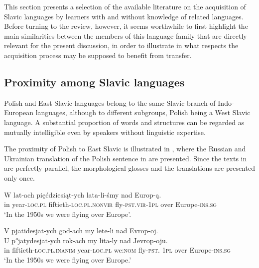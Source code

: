 \documentclass[output=paper,            colorlinks, citecolor=brown            		  ]{langscibook}
\begin{document}
This section presents a selection of the available literature on the acquisition of Slavic languages by learners with and without knowledge of related languages. Before turning to the review, however, it seems worthwhile to first highlight the main similarities between the members of this language family that are directly relevant for the present discussion, in order to illustrate in what respects the acquisition process may be supposed to benefit from transfer.

\subsection{Proximity among Slavic languages}\label{sec:saturno:2.1}

Polish and East Slavic languages belong to the same Slavic branch of Indo-Eu\-ro\-pe\-an languages, although to different subgroups, Polish being a West Slavic language. A substantial proportion of words and structures can be regarded as mutually intelligible even by speakers without linguistic expertise. 

The proximity of Polish to East Slavic is illustrated in , where the Russian and Ukrainian translation of the Polish sentence in  are presented. Since the texts in  are perfectly parallel, the morphological glosses and the translations are presented only once.

\ea\label{ex:saturno:1}
\gll W  lat-ach  pięćdziesiąt-ych   lata-li-śmy   nad   Europ-ą.\footnotemark\\
 in  year-\textsc{loc.pl}  fiftieth-\textsc{loc.pl.nonvir}  fly-\textsc{pst.vir-1pl}  over  Europe-\textsc{ins.sg}\\ 
\glt   ‘In the 1950s we were flying over Europe’.\footnotemark {}
\z

\ea\label{ex:saturno:2} 
\glll V  pjatidesjat-ych  god-ach    my  lete-li  nad  Evrop-oj.\footnotemark[4]\\
  U  pʺjatydesjat-ych  rok-ach    my  lita-ly  nad Jevrop-oju.\footnotemark[5]\\
  in  fiftieth-\textsc{loc.pl.inanim}  year-\textsc{loc.pl}    we:\textsc{nom}  fly-\textsc{pst.} \textsc{1pl}  over  Europe-\textsc{ins.sg}\\ 
\glt  ‘In the 1950s we were flying over Europe.’\footnotemark[6] 
\z
{}
\end{document}
